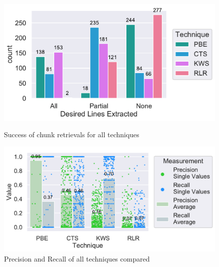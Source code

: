 \documentclass[\myrootdir/main.tex]{subfiles}
\begin{document}
\begin{figure}[htbp]
	\centering
	\begin{minipage}{0.45\textwidth}
		\centering
		\includegraphics[width=\textwidth, clip]{img/big-study/success-partial-all.pdf}
		\caption{Success of chunk retrievals for all techniques}
		\label{fig:success-partial-all}
	\end{minipage}\hfill
	\begin{minipage}{0.45\textwidth}
		\centering
		\includegraphics[width=\textwidth, clip]{img/big-study/recall-precision-all.pdf}
		\caption{Precision and Recall of all techniques compared}
		\label{fig:recall-precision-all}
	\end{minipage}
\end{figure}
\end{document}

